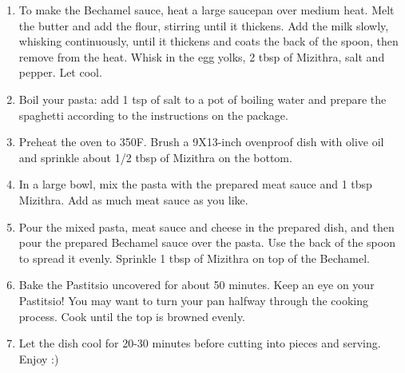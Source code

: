 \begin{enumerate}
    \item To make the Bechamel sauce, heat a large saucepan over medium heat. Melt the butter and add the flour, stirring until it thickens. Add the milk slowly, whisking continuously, until it thickens and coats the back of the spoon, then remove from the heat. Whisk in the egg yolks, 2 tbsp of Mizithra, salt and pepper. Let cool.
    \item Boil your pasta: add 1 tsp of salt to a pot of boiling water and prepare the spaghetti according to the instructions on the package.
    \item Preheat the oven to 350\degree F. Brush a 9X13-inch ovenproof dish with olive oil and sprinkle about 1/2 tbsp of Mizithra on the bottom.
    \item In a large bowl, mix the pasta with the prepared meat sauce and 1 tbsp Mizithra. Add as much meat sauce as you like.
    \item Pour the mixed pasta, meat sauce and cheese in the prepared dish, and then pour the prepared Bechamel sauce over the pasta. Use the back of the spoon to spread it evenly. Sprinkle 1 tbsp of Mizithra on top of the Bechamel.
    \item Bake the Pastitsio uncovered for about 50 minutes. Keep an eye on your Pastitsio! You may want to turn your pan halfway through the cooking process. Cook until the top is browned evenly.
    \item Let the dish cool for 20-30 minutes before cutting into pieces and serving. Enjoy :)
\end{enumerate}
